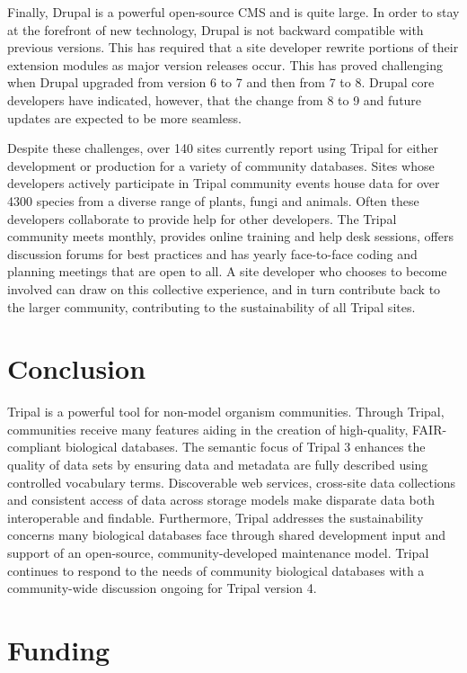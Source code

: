 Finally, Drupal is a powerful open-source CMS and is quite large. In order to stay at the forefront of new technology, Drupal is not backward compatible with previous versions. This has required that a site developer rewrite portions of their extension modules as major version releases occur. This has proved challenging when Drupal upgraded from version 6 to 7 and then from 7 to 8. Drupal core developers have indicated, however, that the change from 8 to 9 and future updates are expected to be more seamless.

Despite these challenges, over 140 sites currently report using Tripal for either development or production for a variety of community databases. Sites whose developers actively participate in Tripal community events house data for over 4300 species from a diverse range of plants, fungi and animals. Often these developers collaborate to provide help for other developers. The Tripal community meets monthly, provides online training and help desk sessions, offers discussion forums for best practices and has yearly face-to-face coding and planning meetings that are open to all. A site developer who chooses to become involved can draw on this collective experience, and in turn contribute back to the larger community, contributing to the sustainability of all Tripal sites.

\section*{Conclusion}

Tripal is a powerful tool for non-model organism communities. Through Tripal, communities receive many features aiding in the creation of high-quality, FAIR-compliant biological databases. The semantic focus of Tripal 3 enhances the quality of data sets by ensuring data and metadata are fully described using controlled vocabulary terms. Discoverable web services, cross-site data collections and consistent access of data across storage models make disparate data both interoperable and findable. Furthermore, Tripal addresses the sustainability concerns many biological databases face through shared development input and support of an open-source, community-developed maintenance model. Tripal continues to respond to the needs of community biological databases with a community-wide discussion ongoing for Tripal version 4.

\section*{Funding}

